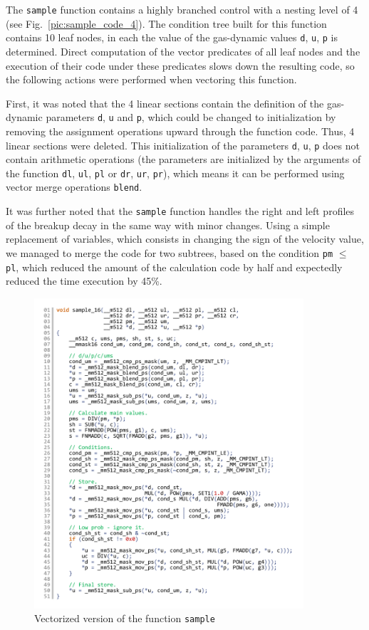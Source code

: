 \documentclass[utf8,english]{psta}%
\begin{document}
The \texttt{sample} function contains a highly branched control with a nesting level of 4 (see Fig.~\ref{pic:sample_code_4}).
The condition tree built for this function contains 10 leaf nodes, in each the value of the gas-dynamic values \texttt{d}, \texttt{u}, \texttt{p} is determined.
Direct computation of the vector predicates of all leaf nodes and the execution of their code under these predicates slows down the resulting code, so the following actions were performed when vectoring this function.

First, it was noted that the 4 linear sections contain the definition of the gas-dynamic parameters \texttt{d}, \texttt{u} and \texttt{p}, which could be changed to initialization by removing the assignment operations upward through the function code.
Thus, 4 linear sections were deleted.
This initialization of the parameters \texttt{d}, \texttt{u}, \texttt{p} does not contain arithmetic operations (the parameters are initialized by the arguments of the function \texttt{dl}, \texttt{ul}, \texttt{pl} or \texttt{dr}, \texttt{ur}, \texttt{pr}), which means it can be performed using vector merge operations \texttt{blend}.

It was further noted that the \texttt{sample} function handles the right and left profiles of the breakup decay in the same way with minor changes.
Using a simple replacement of variables, which consists in changing the sign of the velocity value, we managed to merge the code for two subtrees, based on the condition \texttt{pm} $\le$ \texttt{pl}, which reduced the amount of the calculation code by half and expectedly reduced the time execution by 45\%.

\begin{figure}
\includegraphics[width=10cm]{pics/pic_sample_16_code}
\caption{Vectorized version of the function \texttt{sample}}
\label{pic:sample_16_code}
\end{figure}
\end{document}
